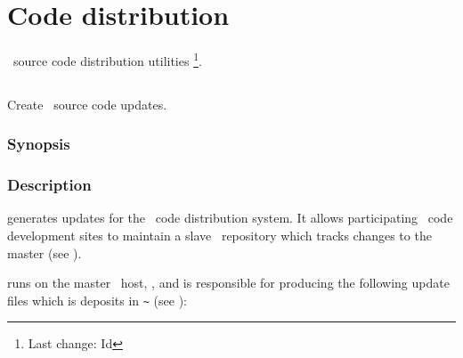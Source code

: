 \chapter{Code distribution}
\label{Code distribution}

\aipspp\ source code distribution utilities \footnote{Last change:
$ $Id$ $}.


\section{}
\label{exhale}

Create \aipspp\ source code updates.

\subsection*{Synopsis}

\begin{synopsis}
\end{synopsis}

\subsection*{Description}

 generates updates for the \aipspp\ code distribution system.  It
allows participating \aipspp\ code development sites to maintain a slave
\rcs\ repository which tracks changes to the master (see ).

 runs on the master \aipspp\ host, , and is
responsible for producing the following update files which is deposits in
\verb+~+ (see ):

